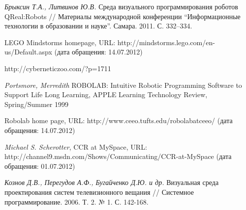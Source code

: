 \documentclass[a4paper]{article}
\begin{document}
\begin{thebibliography}{9001}

   \emph{Брыксин Т.А., Литвинов Ю.В.} Среда визуального программирования роботов QReal:Robots // Материалы международной конференции ``Информационные технологии в образовании и науке''. Самара. 2011. С. 332--334.
  
   LEGO Mindstorms homepage, URL: http://mindstorms.lego.com/en-us/Default.aspx (дата обращения: 14.07.2012)
  
   http://cyberneticzoo.com/?p=1711
  
   \emph{Portsmore, Merredith} ROBOLAB: Intuitive Robotic Programming Software to Support Life Long Learning, APPLE Learning Technology Review, Spring/Summer 1999
  
   Robolab home page, URL: http://www.ceeo.tufts.edu/robolabatceeo/ (дата обращения: 14.07.2012)
  
   \emph{Michael S. Scherotter}, CCR at MySpace, URL: http://channel9.msdn.com/Shows/Communicating/CCR-at-MySpace (дата обращения: 01.07.2012)
  
   \emph{Кознов Д.В., Перегудов А.Ф., Бугайченко Д.Ю. и др.} Визуальная среда проектирования систем телевизионного вещания // Системное программирование. 2006. Т. 2. № 1. С. 142-168.
  
\end{thebibliography}
\end{document}
